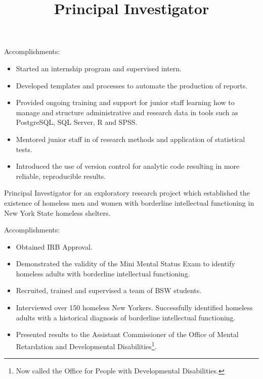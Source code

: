 \documentclass[line, margin, 10pt]{res}
\begin{document}
\begin{resume}
\begin{position}
    Accomplishments:
    \begin{itemize}
    \item Started an internship program and supervised intern.
    \item Developed templates and processes to automate the production
      of reports.
    \item Provided ongoing training and support for junior staff
      learning how to manage and structure administrative and research
      data in tools such as PostgreSQL, SQL Server, R and SPSS.
    \item Mentored junior staff in of research methods and application
      of statistical tests.
    \item Introduced the use of version control for analytic code
      resulting in more reliable, reproducible results.
    \end{itemize}
  \end{position}

  \title{Principal Investigator}
  \begin{position}
    Principal Investigator for an exploratory research project which
    established the existence of homeless men and women with
    borderline intellectual functioning in New York State homeless
    shelters.

    Accomplishments:
    \begin{itemize}
    \item Obtained IRB Approval.
    \item Demonstrated the validity of the Mini Mental Status Exam to
      identify homeless adults with borderline intellectual functioning.
    \item Recruited, trained and supervised a team of BSW students.
    \item Interviewed over 150 homeless New Yorkers. Successfully
      identified homeless adults with a historical diagnosis of
      borderline intellectual functioning.
    \item Presented results to the Assistant Commissioner
      of the Office of Mental Retardation and Developmental
      Disabilities\footnote{Now called the Office for People with
        Developmental Disabilities.}.
    \end{itemize}
  \end{position}



\end{resume}
\end{document}

